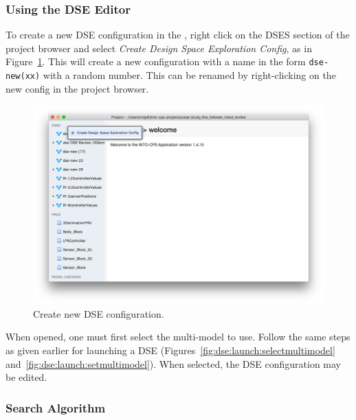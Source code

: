 \subsubsection{Using the \intoapp{} DSE Editor}\label{sec:dse:edit:app}

To create a new DSE configuration in the \intoapp{}, right click on the DSES section of the project browser and select \textit{Create Design Space Exploration Config}, as in Figure~\ref{fig:dse:edit:app-create-config}. This will create a new configuration with a name in the form \texttt{dse-new(xx)} with a random number. This can be renamed by right-clicking on the new config in the project browser.
%
\begin{figure}[ht]
	\centering
	\includegraphics[width=\textwidth]{figures/dse/app-create-config}
	\caption{Create new DSE configuration.}\label{fig:dse:edit:app-create-config}
\end{figure}
%
%
When opened, one must first select the multi-model to use. Follow the same steps as given earlier for launching a DSE (Figures~\ref{fig:dse:launch:selectmultimodel} and~\ref{fig:dse:launch:setmultimodel}). When selected, the DSE configuration may be edited. 

\subsubsection{Search Algorithm}\label{sec:dse:app:algorithm}

